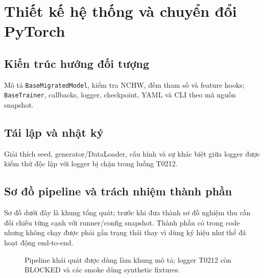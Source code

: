 \chapter{Thiết kế hệ thống và chuyển đổi PyTorch}
\section{Kiến trúc hướng đối tượng}
Mô tả \texttt{BaseMigratedModel}, kiểm tra NCHW, đếm tham số và feature hooks; \texttt{BaseTrainer}, callbacks, logger, checkpoint, YAML và CLI theo mã nguồn snapshot.

\section{Tái lập và nhật ký}
Giải thích seed, generator/DataLoader, cấu hình và sự khác biệt giữa logger được kiểm thử độc lập với logger bị chặn trong luồng T0212.

\section{Sơ đồ pipeline và trách nhiệm thành phần}
Sơ đồ dưới đây là khung tổng quát; trước khi đưa thành sơ đồ nghiệm thu cần đối chiếu từng cạnh với runner/config snapshot. Thành phần có trong code nhưng không chạy được phải gắn trạng thái thay vì dùng ký hiệu như thể đã hoạt động end-to-end.
\begin{figure}[htbp]
\centering
{}
\caption{Pipeline khái quát được dùng làm khung mô tả; logger T0212 còn BLOCKED và các smoke dùng synthetic fixtures.}
\label{fig:btl03-pipeline-template}
\end{figure}

